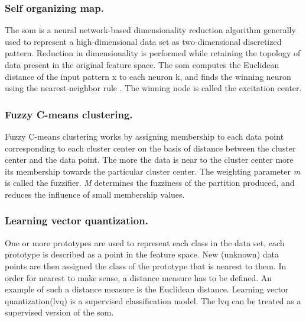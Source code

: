 \documentclass[../main]{subfiles}
\begin{document}
\subsubsection{Self organizing map.}
The \acrfull{som} is a neural network-based dimensionality reduction algorithm generally used to represent a high-dimensional data set as two-dimensional discretized pattern\cite{Du2010Clustering:Approach}.
Reduction in dimensionality is performed while retaining the topology of data present in the original feature space\cite{Du2010Clustering:Approach}.
The \acrlong{som} computes the Euclidean distance of the input pattern x to each neuron k, and finds the winning neuron using the nearest-neighbor rule\cite{Du2010Clustering:Approach} .
The winning node is called the excitation center.

\subsubsection{Fuzzy C-means clustering.}
Fuzzy C-means clustering works by assigning membership to each data point corresponding to each cluster center on the basis of distance between the cluster center and the data point\cite{Du2010Clustering:Approach}.
The more the data is near to the cluster center more its membership towards the particular cluster center.
The weighting parameter \textit{m} is called the fuzzifier\cite{Du2010Clustering:Approach}. 
\textit{M} determines the fuzziness of the partition produced, and reduces the influence of small membership values\cite{Du2010Clustering:Approach}.

\subsubsection{Learning vector quantization.}
One or more prototypes are used to represent each class in the data set, each prototype is described as a point in the feature space\cite{Du2010Clustering:Approach}. 
New (unknown) data points are then assigned the class of the prototype that is nearest to them\cite{Du2010Clustering:Approach}. 
In order for nearest to make sense, a distance measure has to be defined\cite{Du2010Clustering:Approach}. 
An example of such a distance measure is the Euclidean distance.
Learning vector quantization(\acrshort{lvq}) is a supervised classification model.
The \acrshort{lvq} can be treated as a supervised version of the \acrshort{som}\cite{Du2010Clustering:Approach}.
\end{document}
